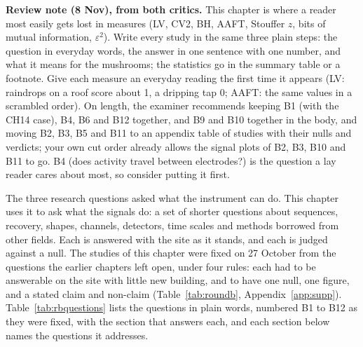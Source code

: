 \begin{instructions}
\textbf{Review note (8 Nov), from both critics.} This chapter is where a reader most easily gets lost in measures
(LV, CV2, BH, AAFT, Stouffer $z$, bits of mutual information, $\varepsilon^2$). Write every study in the same three
plain steps: the question in everyday words, the answer in one sentence with one number, and what it means for the
mushrooms; the statistics go in the summary table or a footnote. Give each measure an everyday reading the first time
it appears (LV: raindrops on a roof score about 1, a dripping tap 0; AAFT: the same values in a scrambled order). On
length, the examiner recommends keeping B1 (with the CH14 case), B4, B6 and B12 together, and B9 and B10 together in
the body, and moving B2, B3, B5 and B11 to an appendix table of studies with their nulls and verdicts; your own cut
order already allows the signal plots of B2, B3, B10 and B11 to go. B4 (does activity travel between electrodes?) is
the question a lay reader cares about most, so consider putting it first.
\end{instructions}

The three research questions asked what the instrument can do. This chapter uses it to ask what the signals do: a set of shorter questions about sequences, recovery, shapes, channels, detectors, time scales and methods borrowed from other fields. Each is answered with the \tool{} site as it stands, and each is judged against a null. The studies of this chapter were fixed on 27 October from the questions the earlier chapters left open, under four rules: each had to be answerable on the site with little new building, and to have one null, one figure, and a stated claim and non-claim (Table~\ref{tab:roundb}, Appendix~\ref{app:supp}). Table~\ref{tab:rbquestions} lists the questions in plain words, numbered B1 to B12 as they were fixed, with the section that answers each, and each section below names the questions it addresses.

